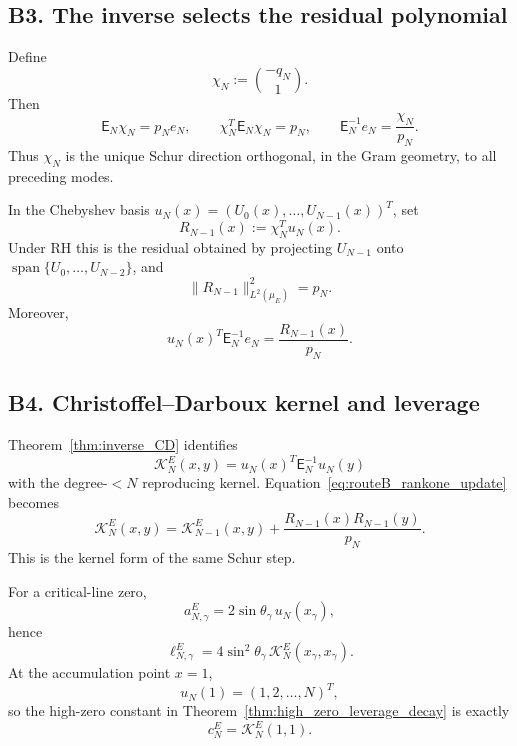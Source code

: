 \documentclass[11pt]{amsart}
\numberwithin{equation}{section}
\theoremstyle{plain}
\theoremstyle{definition}
\theoremstyle{remark}
\newcommand{\E}{\mathsf E}
\newcommand{\Span}{\operatorname{span}}
\begin{document}
\subsection{B3. The inverse selects the residual polynomial}
\label{subsec:routeB_residual}

Define
\begin{equation}
\chi_N:=
\binom{-q_N}{1}.
\label{eq:routeB_chiN}
\end{equation}
Then
\begin{equation}
\boxed{
\E_N\chi_N=p_Ne_N,
\qquad
\chi_N^T\E_N\chi_N=p_N,
\qquad
\E_N^{-1}e_N=\frac{\chi_N}{p_N}.}
\label{eq:routeB_residual_identities}
\end{equation}
Thus \(\chi_N\) is the unique Schur direction orthogonal, in the Gram geometry, to all preceding
modes.

In the Chebyshev basis
\(u_N(x)=(U_0(x),\ldots,U_{N-1}(x))^T\), set
\begin{equation}
R_{N-1}(x):=\chi_N^Tu_N(x).
\label{eq:routeB_residual_polynomial}
\end{equation}
Under RH this is the residual obtained by projecting \(U_{N-1}\) onto
\(\Span\{U_0,\ldots,U_{N-2}\}\), and
\begin{equation}
\boxed{
\|R_{N-1}\|_{L^2(\mu_E)}^2=p_N.}
\label{eq:routeB_residual_energy}
\end{equation}
Moreover,
\[
u_N(x)^T\E_N^{-1}e_N
=
\frac{R_{N-1}(x)}{p_N}.
\]

\subsection{B4. Christoffel--Darboux kernel and leverage}
\label{subsec:routeB_CD}

Theorem~\ref{thm:inverse_CD} identifies
\begin{equation}
\mathcal K_N^E(x,y)
=
u_N(x)^T\E_N^{-1}u_N(y)
\label{eq:routeB_CD_kernel}
\end{equation}
with the degree-\(<N\) reproducing kernel.  Equation~\eqref{eq:routeB_rankone_update} becomes
\begin{equation}
\boxed{
\mathcal K_N^E(x,y)
=
\mathcal K_{N-1}^E(x,y)
+
\frac{R_{N-1}(x)R_{N-1}(y)}{p_N}.}
\label{eq:routeB_CD_update}
\end{equation}
This is the kernel form of the same Schur step.

For a critical-line zero,
\[
a_{N,\gamma}^E
=
2\sin\theta_\gamma\,u_N(x_\gamma),
\]
hence
\begin{equation}
\boxed{
\ell_{N,\gamma}^E
=
4\sin^2\theta_\gamma\,
\mathcal K_N^E(x_\gamma,x_\gamma).}
\label{eq:routeB_leverage_CD}
\end{equation}
At the accumulation point \(x=1\),
\[
u_N(1)=(1,2,\ldots,N)^T,
\]
so the high-zero constant in Theorem~\ref{thm:high_zero_leverage_decay} is exactly
\begin{equation}
c_N^E=\mathcal K_N^E(1,1).
\label{eq:routeB_endpoint_kernel}
\end{equation}
\end{document}
